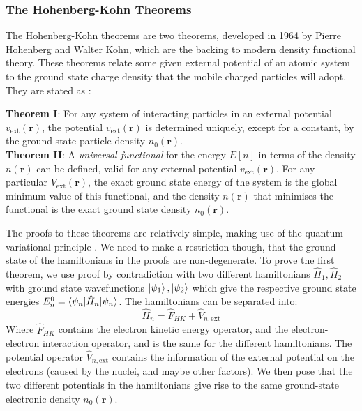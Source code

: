 \documentclass[12pt]{article}
\begin{document}
\subsubsection{The Hohenberg-Kohn Theorems}
The Hohenberg-Kohn theorems \cite{PhysRev.136.B864} are two theorems, developed in 1964 by Pierre Hohenberg and Walter Kohn, which are the backing to modern density functional theory. These theorems relate some given external potential of an atomic system to the ground state charge density that the mobile charged particles will adopt. They are stated as \cite{martin_2004}:
\begin{displayquote}
	\textbf{Theorem I}: For any system of interacting particles in an external potential $v_\mathrm{ext}(\mathbf r)$, the potential $v_\mathrm{ext}(\mathbf r)$ is determined uniquely, except for a constant, by the ground state particle density $n_0(\mathbf{r})$.
\\
	\textbf{Theorem II}: A \textit{universal functional} for the energy $E[n]$ in terms of the density $n(\mathbf r)$ can be defined, valid for any external potential $v_\mathrm{ext}(\mathbf r)$.
For any particular $V_\mathrm{ext}(\mathbf r)$, the exact ground state energy of the system is the global minimum value of this functional, and the density $n(\mathbf r)$ that minimises the functional is the exact ground state density $n_0(\mathbf r)$.
\end{displayquote}
The proofs to these theorems are relatively simple, making use of the quantum variational principle \cite{shankar2012principles}. We need to make a restriction though, that the ground state of the hamiltonians in the proofs are non-degenerate.
To prove the first theorem, we use proof by contradiction with two different hamiltonians $\hat H_1, \hat H_2$ with ground state wavefunctions $\ket{\psi_1}, \ket{\psi_2}$ which give the respective ground state energies $E^0_n=\braket{\psi_n | \hat H_n | \psi_n}$. 
The hamiltonians can be separated into:
\begin{equation}
\hat H_n = \hat F_{HK} + \hat V_{n, \mathrm{ext}}
\end{equation}
Where $\hat F_{HK}$ contains the electron kinetic energy operator, and the electron-electron interaction operator, and is the same for the different hamiltonians. The potential operator $\hat V_{n, \mathrm{ext}}$ contains the information of the external potential on the electrons (caused by the nuclei, and maybe other factors).
We then pose that the two different potentials in the hamiltonians give rise to the same ground-state electronic density $n_0(\mathbf r)$.
\end{document}
